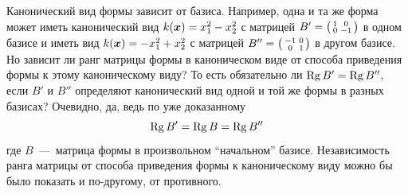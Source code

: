 \documentclass[a4paper,12pt]{article}
\begin{document}
  Канонический вид формы зависит от базиса.
  Например, одна и та же форма может иметь канонический вид $k(\bds x) \hm= x_1^2 - x_2^2$ с матрицей $B' \hm= \left(\begin{smallmatrix} 1 & 0 \\ 0 & -1 \end{smallmatrix}\right)$ в одном базисе и иметь вид $k(\bds x) \hm= -x_1^2 + x_2^2$ с матрицей $B'' \hm= \left(\begin{smallmatrix} -1 & 0 \\ 0 & 1 \end{smallmatrix}\right)$ в другом базисе.
  Но зависит ли ранг матрицы формы в каноническом виде от способа приведения формы к этому каноническому виду?
  То есть обязательно ли $\Rg B' \hm= \Rg B''$, если $B'$ и $B''$ определяют канонический вид одной и той же формы в разных базисах?
  Очевидно, да, ведь по уже доказанному
  \[
    \operatorname{Rg} B' = \operatorname{Rg} B = \operatorname{Rg} B''
  \]
  где $B$~---~матрица формы в произвольном ``начальном'' базисе.
  Независимость ранга матрицы от способа приведения формы к каноническому виду можно бы было показать и по-другому, от противного.
  
\end{document}
